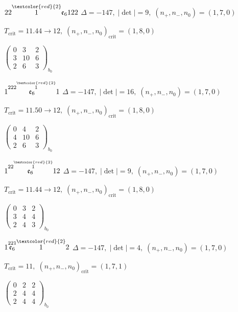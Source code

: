 \documentclass[10pt]{article}
\begin{document}
$22\overset{\textcolor{red}{2}}{1}\mathfrak{e}_6122$ \quad $\Delta=-147,\; |\det|=9,\; (n_+,n_-,n_0)=(1,7,0)$

\hspace{1em}$T_{\text{crit}}=11.44 \to 12,\; (n_+,n_-,n_0)_{\text{crit}}=(1,8,0)$

\hspace{2em}$\left(\begin{smallmatrix}0 & 3 & 2 \\ 3 & 10 & 6 \\ 2 & 6 & 3\end{smallmatrix}\right)_{\!b_0}$

\smallskip

$1\overset{222\overset{\textcolor{red}{2}}{1}}{\mathfrak{e}_6}1$ \quad $\Delta=-147,\; |\det|=16,\; (n_+,n_-,n_0)=(1,7,0)$

\hspace{1em}$T_{\text{crit}}=11.50 \to 12,\; (n_+,n_-,n_0)_{\text{crit}}=(1,8,0)$

\hspace{2em}$\left(\begin{smallmatrix}0 & 4 & 2 \\ 4 & 10 & 6 \\ 2 & 6 & 3\end{smallmatrix}\right)_{\!b_0}$

\smallskip

$1\overset{22\overset{\textcolor{red}{2}}{1}}{\mathfrak{e}_6}12$ \quad $\Delta=-147,\; |\det|=9,\; (n_+,n_-,n_0)=(1,7,0)$

\hspace{1em}$T_{\text{crit}}=11.44 \to 12,\; (n_+,n_-,n_0)_{\text{crit}}=(1,8,0)$

\hspace{2em}$\left(\begin{smallmatrix}0 & 3 & 2 \\ 3 & 4 & 4 \\ 2 & 4 & 3\end{smallmatrix}\right)_{\!b_0}$

$1\overset{221}{\mathfrak{e}_6}\overset{\textcolor{red}{2}}{1}2$ \quad $\Delta=-147,\; |\det|=4,\; (n_+,n_-,n_0)=(1,7,0)$

\hspace{1em}$T_{\text{crit}}=11,\; (n_+,n_-,n_0)_{\text{crit}}=(1,7,1)$

\hspace{2em}$\left(\begin{smallmatrix}0 & 2 & 2 \\ 2 & 4 & 4 \\ 2 & 4 & 4\end{smallmatrix}\right)_{\!b_0}$
\end{document}
